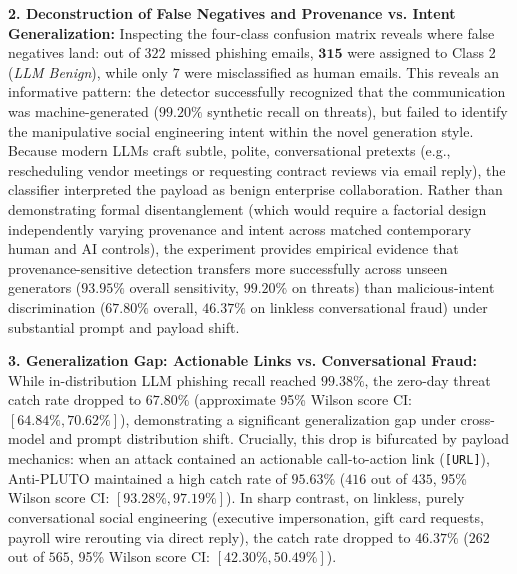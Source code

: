 \documentclass[journal]{IEEEtran}
\begin{document}
\textbf{2. Deconstruction of False Negatives and Provenance vs. Intent Generalization:} 
Inspecting the four-class confusion matrix reveals where false negatives land: out of $322$ missed phishing emails, $\mathbf{315}$ were assigned to Class 2 (\emph{LLM Benign}), while only $7$ were misclassified as human emails. This reveals an informative pattern: the detector successfully recognized that the communication was machine-generated ($99.20\%$ synthetic recall on threats), but failed to identify the manipulative social engineering intent within the novel generation style. Because modern LLMs craft subtle, polite, conversational pretexts (e.g., rescheduling vendor meetings or requesting contract reviews via email reply), the classifier interpreted the payload as benign enterprise collaboration. Rather than demonstrating formal disentanglement (which would require a factorial design independently varying provenance and intent across matched contemporary human and AI controls), the experiment provides empirical evidence that provenance-sensitive detection transfers more successfully across unseen generators ($93.95\%$ overall sensitivity, $99.20\%$ on threats) than malicious-intent discrimination ($67.80\%$ overall, $46.37\%$ on linkless conversational fraud) under substantial prompt and payload shift.

\textbf{3. Generalization Gap: Actionable Links vs. Conversational Fraud:} 
While in-distribution LLM phishing recall reached $99.38\%$, the zero-day threat catch rate dropped to $67.80\%$ (approximate 95\% Wilson score CI: $[64.84\%, 70.62\%]$), demonstrating a significant generalization gap under cross-model and prompt distribution shift. Crucially, this drop is bifurcated by payload mechanics: when an attack contained an actionable call-to-action link (\texttt{[URL]}), Anti-PLUTO maintained a high catch rate of $\mathbf{95.63\%}$ ($416$ out of $435$, 95\% Wilson score CI: $[93.28\%, 97.19\%]$). In sharp contrast, on linkless, purely conversational social engineering (executive impersonation, gift card requests, payroll wire rerouting via direct reply), the catch rate dropped to $\mathbf{46.37\%}$ ($262$ out of $565$, 95\% Wilson score CI: $[42.30\%, 50.49\%]$). 
\end{document}
